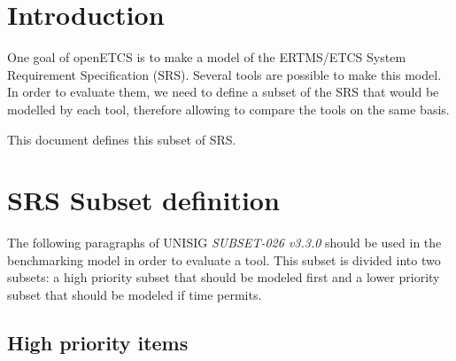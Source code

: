 \documentclass{template/openetcs_article}
\begin{document}
\setlength{\marginparwidth}{1in}
\let\oldmarginpar\marginpar
\renewcommand\marginpar[1]{\-\oldmarginpar[\raggedleft\scriptsize #1]%
{\raggedright\scriptsize #1}}

\newcommand{\oldtext}[1]{{Old: \scriptsize #1}}

\newenvironment{inoutput}
{\vspace{2mm}
\noindent
\begin{tabular}{|r|p{.68\linewidth}|l|}
\hline}
{
\hline
\end{tabular}}

\section{Introduction}

One goal of openETCS is to make a model of the ERTMS/ETCS System
Requirement Specification (SRS). Several tools are possible to make
this model. In order to evaluate them, we need to define a subset of
the SRS that would be modelled by each tool, therefore allowing to
compare the tools on the same basis.

This document defines this subset of SRS.

\section{SRS Subset definition}

The following paragraphs of UNISIG \emph{SUBSET-026 v3.3.0} should be
used in the benchmarking model in order to evaluate a tool. This
subset is divided into two subsets: a high priority subset that should
be modeled first and a lower priority subset that should be modeled if
time permits.

\subsection{High priority items}
\end{document}

